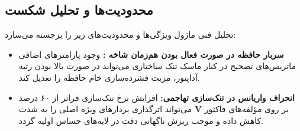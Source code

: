\subsection{محدودیت‌ها و تحلیل شکست}
تحلیل فنی ماژول  ویژگی‌ها و محدودیت‌های زیر را برجسته می‌سازد:
\begin{itemize}
    \item \textbf{سربار حافظه در صورت فعال بودن هم‌زمان شاخه :} وجود پارامترهای اضافی ماتریس‌های تصحیح  در کنار ماسک تنک ساختاری می‌تواند در صورت بالا بودن رتبه آداپتور، مزیت فشرده‌سازی خام حافظه را تعدیل کند.
    \item \textbf{انحراف واریانس در تنک‌سازی تهاجمی:} افزایش نرخ تنک‌سازی فراتر از ۶۰ درصد بر روی مؤلفه‌های فاکتور $\mathbf{V}$ می‌تواند اثرگذاری بردارهای ویژه اصلی را به شدت کاهش داده و موجب ریزش ناگهانی دقت در لایه‌های حساس اولیه گردد.
\end{itemize}
